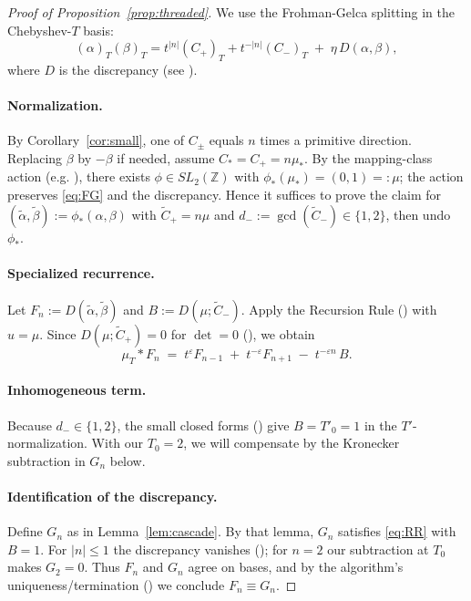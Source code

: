 \documentclass[12pt]{article}
\begin{document}
\begin{proof}[Proof of Proposition~\ref{prop:threaded}]
We use the Frohman-Gelca splitting in the Chebyshev-$T$ basis:
\begin{equation}\label{eq:FG}
(\alpha)_T(\beta)_T
= t^{|n|}(C_+)_T+t^{-|n|}(C_-)_T \;+\; \eta\,D(\alpha,\beta),
\end{equation}
where $D$ is the discrepancy (see \cite[Def.\ 2.5/Eq.\ (1)]{wangwong}).

\paragraph{Normalization.}
By Corollary~\ref{cor:small}, one of $C_\pm$ equals $n$ times a primitive direction.
Replacing $\beta$ by $-\beta$ if needed, assume $C_\ast=C_+=n\mu_\ast$.
By the mapping-class action (e.g. \cite[Lem.\ 3.2]{wangwong}), there exists $\phi\in SL_2(\mathbb Z)$ with
$\phi_*(\mu_\ast)=(0,1)=:\mu$; the action preserves \eqref{eq:FG} and the discrepancy.
Hence it suffices to prove the claim for $(\tilde\alpha,\tilde\beta):=\phi_*(\alpha,\beta)$ with
$\tilde C_+=n\mu$ and $d_-:=\gcd(\tilde C_-)\in\{1,2\}$, then undo $\phi_*$.

\paragraph{Specialized recurrence.}
Let $F_n:=D(\tilde\alpha,\tilde\beta)$ and $B:=D(\mu;\tilde C_-)$.
Apply the Recursion Rule (\cite[Thm.\ 3.1]{wangwong}) with $u=\mu$.
Since $D(\mu;\tilde C_+)=0$ for $\det=0$ (\cite[Lem.\ 2.6]{wangwong}), we obtain
\begin{equation}\label{eq:RR}
\mu_T\ast F_n \;=\; t^{\varepsilon}F_{n-1} \;+\; t^{-\varepsilon}F_{n+1} \;-\; t^{-\varepsilon n}\,B.
\end{equation}

\paragraph{Inhomogeneous term.}
Because $d_-\in\{1,2\}$, the small closed forms (\cite[Prop.\ 4.1-4.3]{wangwong}) give $B=T'_0=1$ in the $T'$-normalization.
With our $T_0=2$, we will compensate by the Kronecker subtraction in $G_n$ below.

\paragraph{Identification of the discrepancy.}
Define $G_n$ as in Lemma~\ref{lem:cascade}. By that lemma, $G_n$ satisfies \eqref{eq:RR} with $B=1$.
For $|n|\le1$ the discrepancy vanishes (\cite[Lem.\ 2.6-2.8]{wangwong}); for $n=2$ our subtraction at $T_0$ makes $G_2=0$.
Thus $F_n$ and $G_n$ agree on bases, and by the algorithm's uniqueness/termination
(\cite[Prop.\ 5.1, Rem.\ 5.2, Prop.\ 5.4]{wangwong}) we conclude $F_n\equiv G_n$.


\end{proof}
\end{document}
